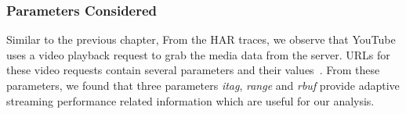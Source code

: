 \subsubsection{Parameters Considered}
Similar to the previous chapter, From the \ac{HAR} traces, we observe that YouTube uses a video playback request to grab the media data from the server. \acp{URL} for these video requests contain several parameters and their values~\cite{mondal2017youtube}. From these parameters, we found that three parameters \textit{itag}, \textit{range} and  \textit{rbuf} provide adaptive streaming performance related information which are useful for our analysis. %

